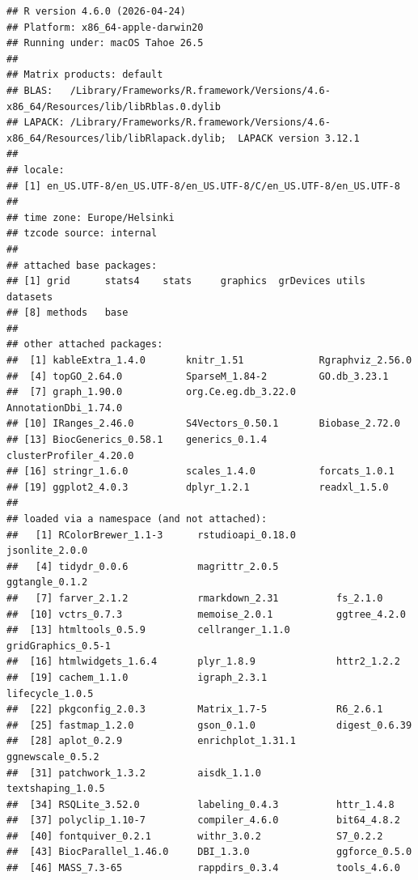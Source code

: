 \documentclass[
  11pt,
]{article}
\begin{document}
\begin{verbatim}
## R version 4.6.0 (2026-04-24)
## Platform: x86_64-apple-darwin20
## Running under: macOS Tahoe 26.5
## 
## Matrix products: default
## BLAS:   /Library/Frameworks/R.framework/Versions/4.6-x86_64/Resources/lib/libRblas.0.dylib 
## LAPACK: /Library/Frameworks/R.framework/Versions/4.6-x86_64/Resources/lib/libRlapack.dylib;  LAPACK version 3.12.1
## 
## locale:
## [1] en_US.UTF-8/en_US.UTF-8/en_US.UTF-8/C/en_US.UTF-8/en_US.UTF-8
## 
## time zone: Europe/Helsinki
## tzcode source: internal
## 
## attached base packages:
## [1] grid      stats4    stats     graphics  grDevices utils     datasets 
## [8] methods   base     
## 
## other attached packages:
##  [1] kableExtra_1.4.0       knitr_1.51             Rgraphviz_2.56.0      
##  [4] topGO_2.64.0           SparseM_1.84-2         GO.db_3.23.1          
##  [7] graph_1.90.0           org.Ce.eg.db_3.22.0    AnnotationDbi_1.74.0  
## [10] IRanges_2.46.0         S4Vectors_0.50.1       Biobase_2.72.0        
## [13] BiocGenerics_0.58.1    generics_0.1.4         clusterProfiler_4.20.0
## [16] stringr_1.6.0          scales_1.4.0           forcats_1.0.1         
## [19] ggplot2_4.0.3          dplyr_1.2.1            readxl_1.5.0          
## 
## loaded via a namespace (and not attached):
##   [1] RColorBrewer_1.1-3      rstudioapi_0.18.0       jsonlite_2.0.0         
##   [4] tidydr_0.0.6            magrittr_2.0.5          ggtangle_0.1.2         
##   [7] farver_2.1.2            rmarkdown_2.31          fs_2.1.0               
##  [10] vctrs_0.7.3             memoise_2.0.1           ggtree_4.2.0           
##  [13] htmltools_0.5.9         cellranger_1.1.0        gridGraphics_0.5-1     
##  [16] htmlwidgets_1.6.4       plyr_1.8.9              httr2_1.2.2            
##  [19] cachem_1.1.0            igraph_2.3.1            lifecycle_1.0.5        
##  [22] pkgconfig_2.0.3         Matrix_1.7-5            R6_2.6.1               
##  [25] fastmap_1.2.0           gson_0.1.0              digest_0.6.39          
##  [28] aplot_0.2.9             enrichplot_1.31.1       ggnewscale_0.5.2       
##  [31] patchwork_1.3.2         aisdk_1.1.0             textshaping_1.0.5      
##  [34] RSQLite_3.52.0          labeling_0.4.3          httr_1.4.8             
##  [37] polyclip_1.10-7         compiler_4.6.0          bit64_4.8.2            
##  [40] fontquiver_0.2.1        withr_3.0.2             S7_0.2.2               
##  [43] BiocParallel_1.46.0     DBI_1.3.0               ggforce_0.5.0          
##  [46] MASS_7.3-65             rappdirs_0.3.4          tools_4.6.0            

\end{verbatim}
\end{document}

